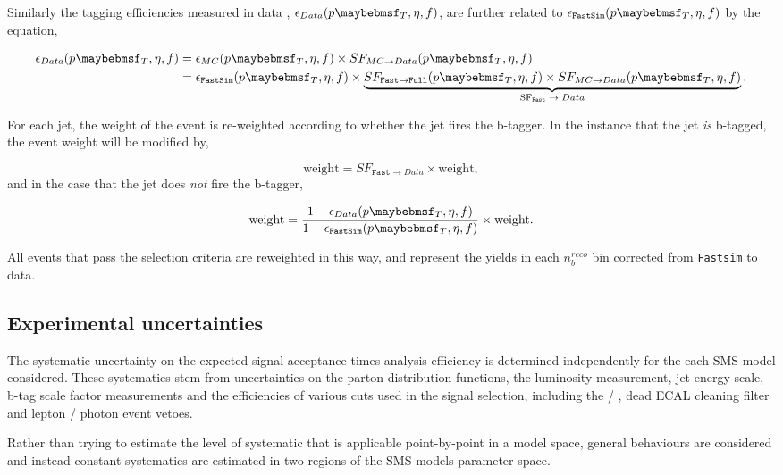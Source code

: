 Similarly the tagging efficiencies measured in data \cite{btag8tev}, $\epsilon_{Data}(\pt,\eta,f)$, are further related to $\epsilon_{\texttt{FastSim}}(\pt,\eta,f)$ by the equation,

\begin{align}
\epsilon_{Data}(\pt,\eta,f) &=  \epsilon_{MC}(\pt,\eta,f) \times SF_{MC\rightarrow Data}(\pt,\eta,f) \nonumber \\
&=  \epsilon_{\texttt{FastSim}}(\pt,\eta,f) \times \underbrace{SF_{\texttt{Fast}\rightarrow\texttt{Full}}(\pt,\eta,f) \times SF_{MC\rightarrow Data}(\pt,\eta,f)}_\text{SF$_{\texttt{Fast}} \rightarrow Data$}.
\end{align}

For each jet, the weight of the event is re-weighted according to whether the jet fires the b-tagger. In the instance that the jet \emph{is} b-tagged, the event weight will be modified by,

\begin{equation}
\text{weight} = SF_{\texttt{Fast} \rightarrow Data} \times \text{weight},
\end{equation} 
and in the case that the jet does \emph{not} fire the b-tagger,

\begin{equation}
\text{weight} = \frac{1-\epsilon_{Data}(\pt,\eta,f)}{1- \epsilon_{\texttt{FastSim}}(\pt,\eta,f)}\times \text{weight}.
\end{equation}

 All events that pass the selection criteria are reweighted in this way, and represent the yields in each $n_{b}^{reco}$ bin corrected from \texttt{Fastsim} to data. 

\subsection{Experimental uncertainties}

The systematic uncertainty on the expected signal acceptance times analysis efficiency is determined independently for the each \ac{SMS} model considered. These systematics stem from uncertainties on the parton distribution functions, the luminosity measurement, jet energy scale, b-tag scale factor measurements and the efficiencies of various cuts used in the signal selection, including the \mht / \met, dead \ac{ECAL} cleaning filter and lepton / photon event vetoes. 

Rather than trying to estimate the level of systematic that is applicable point-by-point in a model space, general behaviours are considered and instead constant systematics are estimated in two regions of the \ac{SMS} models parameter space. 

